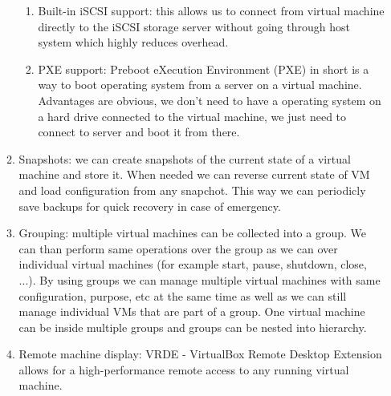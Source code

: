 \begin{enumerate}
\begin{enumerate}
\begin{enumerate}
\item Built-in iSCSI support: this allows us to connect from virtual machine directly to the iSCSI storage server without going through host system which
highly reduces overhead.
\item PXE support: Preboot eXecution Environment (PXE) in short is a way to boot operating system from a server on a virtual machine. Advantages are obvious, we don't need to have a operating system on a hard drive connected to the virtual machine, we just need to connect to server and boot it from there.
\end{enumerate}
\item Snapshots: we can create snapshots of the current state of a virtual machine and store it. When needed we can reverse current state of VM and load configuration from any snapchot. This way we can periodicly save backups for quick recovery in case of emergency.
\item Grouping: multiple virtual machines can be collected into a group. We can than perform same operations over the group as we can over individual virtual machines (for example start, pause, shutdown, close, ...). By using groups we can manage multiple virtual machines with same configuration, purpose, etc at the same time as well as we can still manage individual VMs that are part of a group. One virtual machine can be inside multiple groups and groups can be nested into hierarchy.
\item Remote machine display: VRDE - VirtualBox Remote Desktop Extension allows for a high-performance remote access to any running virtual machine.
\end{enumerate}



\end{enumerate}
